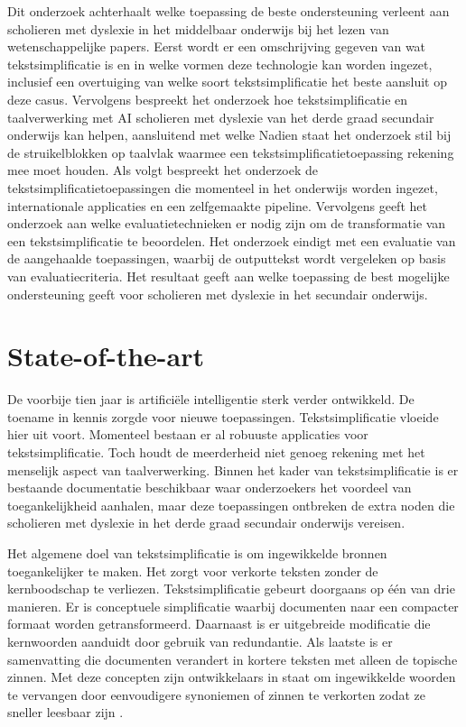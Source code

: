 Dit onderzoek achterhaalt welke toepassing de beste ondersteuning verleent aan scholieren met dyslexie in het middelbaar onderwijs bij het lezen van wetenschappelijke papers. Eerst wordt er een omschrijving gegeven van wat tekstsimplificatie is en in welke vormen deze technologie kan worden ingezet, inclusief een overtuiging van welke soort tekstsimplificatie het beste aansluit op deze casus. Vervolgens bespreekt het onderzoek hoe tekstsimplificatie en taalverwerking met AI scholieren met dyslexie van het derde graad secundair onderwijs kan helpen, aansluitend met welke  Nadien staat het onderzoek stil bij de struikelblokken op taalvlak waarmee een tekstsimplificatietoepassing rekening mee moet houden. Als volgt bespreekt het onderzoek de tekstsimplificatietoepassingen die momenteel in het onderwijs worden ingezet, internationale applicaties en een zelfgemaakte pipeline. Vervolgens geeft het onderzoek aan welke evaluatietechnieken er nodig zijn om de transformatie van een tekstsimplificatie te beoordelen. Het onderzoek eindigt met een evaluatie van de aangehaalde toepassingen, waarbij de outputtekst wordt vergeleken op basis van evaluatiecriteria. Het resultaat geeft aan welke toepassing de best mogelijke ondersteuning geeft voor scholieren met dyslexie in het secundair onderwijs.


\section{State-of-the-art}%
\label{sec:state-of-the-art}

De voorbije tien jaar is artificiële intelligentie sterk verder ontwikkeld. De toename in kennis zorgde voor nieuwe toepassingen. Tekstsimplificatie vloeide hier uit voort. Momenteel bestaan er al robuuste applicaties voor tekstsimplificatie. Toch houdt de meerderheid niet genoeg rekening met het menselijk aspect van taalverwerking. Binnen het kader van tekstsimplificatie is er bestaande documentatie beschikbaar waar onderzoekers het voordeel van toegankelijkheid aanhalen, maar deze toepassingen ontbreken de extra noden die scholieren met dyslexie in het derde graad secundair onderwijs vereisen.

Het algemene doel van tekstsimplificatie is om ingewikkelde bronnen toegankelijker te maken. Het zorgt voor verkorte teksten zonder de kernboodschap te verliezen. Tekstsimplificatie \newline gebeurt doorgaans op één van drie manieren. Er is conceptuele simplificatie waarbij documenten naar een compacter formaat worden getransformeerd. Daarnaast is er uitgebreide modificatie die kernwoorden aanduidt door gebruik van redundantie. Als laatste is er samenvatting die documenten verandert in kortere teksten met alleen de topische zinnen. Met deze concepten zijn ontwikkelaars in staat om ingewikkelde woorden te vervangen door eenvoudigere synoniemen of zinnen te verkorten zodat ze sneller leesbaar zijn \autocite{Siddharthan2014}.

